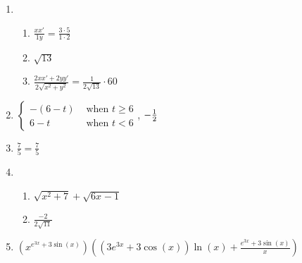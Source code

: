 \documentclass[12pt,twoside]{article}
\makeatletter
\def\emptycleardoublepage{\clearpage\if@twoside \ifodd\c@page\else
\thispagestyle{empty}%
\hbox{}\newpage\if@twocolumn\hbox{}\newpage\fi\fi\fi}
\makeatother
\begin{document}
\begin{multicols}{2}
\begin{enumerate}
\def \b{1}\def \x{3}\def \y{2}\def \xchange{5}\def \ratrhs{6}\def \cirrhs{13}\def \hyprhs{5}\def \compy{y^{2}}\def \ychangenum{10}\def \dist{13}\def \fracrat{\frac{50}{3}}\def \fraccirc{0}\def \frachyp{60}
\item \begin{enumerate}
\item $\frac{xx'}{\b y} = \frac{\x \cdot \xchange}{\b \cdot \y}$
\item $\sqrt{\dist}$
\item $\frac{2xx'+2yy'}{2\sqrt{x^2+y^2}} = \frac{1}{2\sqrt{\dist}} \cdot \frachyp$
\end{enumerate}
\def \a{6}\def \k{2}\def \abstop{1}\def \ktop{0}
\item $\begin{cases} -(\a -t) & \text{ when } t \geq \a \\ \a-t & \text{ when } t < \a \end{cases}$, $\ifthenelse{\ktop=1}{-\k}{-\frac{1}{\k}}$
\def \a{4}\def \b{-3}\def \k{5}\def \fancyp{x^{2}-x^{}-12}\def \simplep{5x^{}-20}\def \fancyreduced{7}\def \niceanstop{\frac{7}{5}}\def \niceansbottom{\frac{5}{7}}
\item $\frac{\fancyreduced}{\k} = \niceanstop$
\def \a{2}\def \b{4}\def \ab{8}\def \c{7}\def \amb{-2}\def \ansroot{11}\def \firstroot{x^{2}+7}\def \secondroot{6x^{}-1}\def \porm{1}
\item \begin{enumerate}
\item $\sqrt{\firstroot} + \sqrt{\secondroot}$
\item $\frac{\amb}{2\sqrt{\ansroot}}$
\end{enumerate}
\def \varexp{3}\def \newexp{2}\def \trigcoeff{3}\def \trigval{+3}\def \oppval{-3}
\item $(x^{e^{\varexp x} \trigval \sin(x)}) \left( (\varexp e^{\varexp x} \trigval \cos(x))\ln(x) + \frac{e^{\varexp x} \trigval \sin(x)}{x} \right)$
 \end{enumerate}\end{multicols}\emptycleardoublepage{}\graphicspath{{C:/Users/iainc/anaconda3/Randomizer/MATH 1001/Midterm 1/}}\begin{multicols}{2} \begin{enumerate}\def \a{-2}\def \b{5}\def \c{-7}\def \d{4}\def \negb{-5}\def \negc{7}\def \determ{27}\def \ansa{\frac{4}{27}}\def \ansb{\frac{-5}{27}}\def \ansc{\frac{7}{27}}\def \ansd{\frac{-2}{27}}

\end{enumerate}
\end{multicols}
\end{document}

